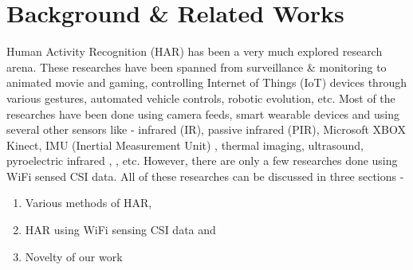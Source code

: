 \documentclass[conference]{IEEEtran}
\begin{document}
\section{Background \& Related Works}
Human Activity Recognition (HAR) has been a very much explored research arena. These researches have been spanned from surveillance \& monitoring to animated movie and gaming, controlling Internet of Things (IoT) devices through various gestures, automated vehicle controls, robotic evolution, etc. Most of the researches have been done using camera feeds, smart wearable devices and using several other sensors like - infrared (IR), passive infrared (PIR), Microsoft XBOX Kinect, IMU (Inertial Measurement Unit) \cite{imu_human}, thermal imaging, ultrasound, pyroelectric infrared \cite{pyroelectric_human1}, \cite{pyroelectric_human2}, etc.
However, there are only a few researches done using WiFi sensed CSI data. All of these researches can be discussed in three sections -
\begin{enumerate}
\item Various methods of HAR,
\item HAR using WiFi sensing CSI data and
\item Novelty of our work
\end{enumerate}
\end{document}

